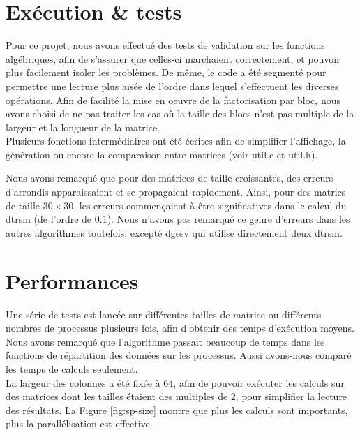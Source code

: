 \section{Exécution \& tests} %
\label{sec:execution}

Pour ce projet, nous avons effectué des tests de validation sur les fonctions algébriques, afin de s'assurer que celles-ci marchaient correctement, et pouvoir plus facilement isoler les problèmes. De même, le code a été segmenté pour permettre une lecture plus aisée de l'ordre dans lequel s'effectuent les diverses opérations. Afin de facilité la mise en oeuvre de la factorisation par bloc, nous avons choisi de ne pas traiter les cas où la taille des blocs n'est pas multiple de la largeur et la longueur de la matrice.\\

Plusieurs fonctions intermédiaires ont été écrites afin de simplifier l'affichage, la génération ou encore la comparaison entre matrices (voir util.c et util.h).

Nous avons remarqué que pour des matrices de taille croissantes, des erreurs d'arrondis apparaissaient et se propagaient rapidement. Ainsi, pour des matrics de taille $30 \times 30$, les erreurs commençaient à être significatives dans le calcul du dtrsm (de l'ordre de $0.1$). Nous n'avons pas remarqué ce genre d'erreurs dans les autres algorithmes toutefois, excepté dgesv qui utilise directement deux dtrsm. 

\section{Performances} %
\label{sec:perf}

Une série de tests est lancée sur différentes tailles de matrice ou différents nombres de processus plusieurs fois, afin d'obtenir des temps d'exécution moyens. Nous avons remarqué que l'algorithme passait beaucoup de temps dans les fonctions de répartition des données sur les processus. Aussi avons-nous comparé les temps de calculs seulement. \\
La largeur des colonnes a été fixée à $64$, afin de pouvoir exécuter les calculs sur des matrices dont les tailles étaient des multiples de 2, pour simplifier la lecture des résultats. 
La Figure \ref{fig:sp-size} montre que plus les calculs sont importants, plus la parallélisation est effective.

